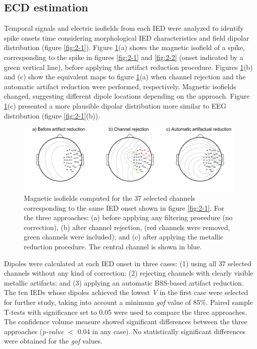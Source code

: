 \subsection{ECD estimation}

Temporal signals and electric isofields from each IED were analyzed to identify spike onsets time considering morphological IED characteristics and field dipolar distribution (figure \ref{fig:2-1}). Figure \ref{fig:2-4}(a) shows the magnetic isofield of a spike, corresponding to the spike in figures \ref{fig:2-1} and \ref{fig:2-2} (onset indicated by a green vertical line), before applying the artifact reduction procedure. Figures \ref{fig:2-4}(b) and (c) show the equivalent maps to figure \ref{fig:2-4}(a) when channel rejection and the automatic artifact reduction were performed, respectively. Magnetic isofields changed, suggesting different dipole locations depending on the approach. Figure \ref{fig:2-4}(c) presented a more plausible dipolar distribution more similar to EEG distribution (figure \ref{fig:2-1}(b)).

\begin{figure}[h]
\centering
\hspace*{-1cm}
\includegraphics[width=1.1\textwidth]{Images/fig2-4.png}
\caption{Magnetic isofields computed for the 37 selected channels corresponding to the same IED onset shown in figure \ref{fig:2-1}. For the three approaches: (a) before applying any filtering procedure (no correction), (b) after channel rejection, (red channels were removed, green channels were included); and (c) after applying the metallic reduction procedure. The central channel is shown in blue.}
\label{fig:2-4}
\end{figure} 

Dipoles were calculated at each IED onset in three cases: (1) using all 37 selected channels without any kind of correction; (2) rejecting channels with clearly visible metallic artifacts; and (3) applying an automatic BSS-based artifact reduction. The ten IEDs whose dipoles achieved the lowest \textit{V} in the first case were selected for further study, taking into account a minimum \textit{gof} value of 85\%. Paired sample T-tests with significance set to 0.05 were used to compare the three approaches. The confidence volume measure showed significant differences between the three approaches (\textit{p-value} $<$ 0.04 in any case). No statistically significant differences were obtained for the \textit{gof} values.

